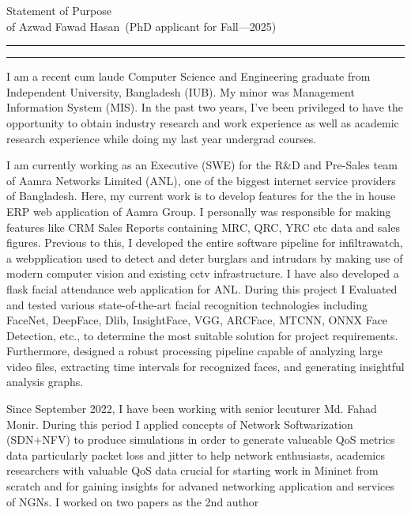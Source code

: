 \documentclass{article}
\newcommand{\soptitle}{Statement of Purpose}
\newcommand{\yourname}{Azwad Fawad Hasan}
\begin{document}
\begin{center}\LARGE\soptitle\\
\large of \yourname\ (PhD applicant for Fall---2025)
\end{center}

\hrule
\vspace{1pt}
\hrule height 1pt

\bigskip

I am a recent cum laude Computer Science and Engineering graduate from Independent University, Bangladesh (IUB). My minor was Management Information System (MIS). In the past two years, I've been privileged to have the opportunity to obtain industry research and work experience as well as academic research experience while doing my last year undergrad courses.

I am currently working as an Executive (SWE) for the R\&D and Pre-Sales team of Aamra Networks Limited (ANL), one of the biggest internet service providers of Bangladesh. Here, my current work is to develop features for the the in house ERP web application of Aamra Group. I personally was responsible for making features like CRM Sales Reports containing MRC, QRC, YRC etc data and sales figures. Previous to this, I developed the entire software pipeline for infiltrawatch, a webpplication used to detect and deter burglars and intrudars by making use of modern computer vision and existing cctv infrastructure. I have also developed a flask facial attendance web application for ANL. During this project I Evaluated and tested various state-of-the-art facial recognition technologies including FaceNet, DeepFace, Dlib, InsightFace, VGG, ARCFace, MTCNN, ONNX Face Detection, etc., to determine the most suitable solution for project requirements. Furthermore, designed a robust processing pipeline capable of analyzing large video files, extracting time intervals for recognized faces, and generating insightful analysis graphs. 







Since September 2022, I have been working with senior lecuturer Md. Fahad Monir. During this period I applied concepts of Network Softwarization (SDN+NFV) to produce simulations in order to generate valueable QoS metrics data particularly packet loss and jitter to help network enthusiasts, academics researchers with valuable QoS data crucial for starting work in Mininet from scratch and for gaining insights for advaned networking application and services of NGNs. I worked on two papers as the 2nd author
\end{document}
